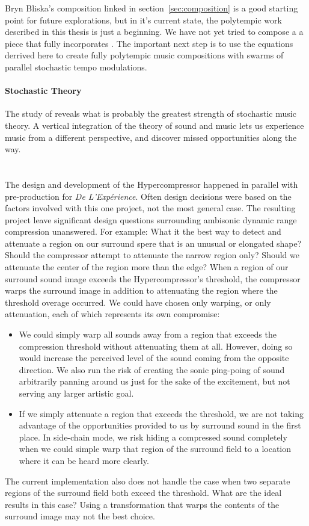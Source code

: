 Bryn Bliska's composition linked in section~\ref{sec:composition} is a
good starting point for future explorations, but in it's current
state, the polytempic work described in this thesis is just a
beginning. We have not yet tried to compose a a piece that fully
incorporates \polytempic. The important next step is to use the
equations derrived here to create fully polytempic music compositions
with swarms of parallel stochastic tempo modulations.

\paragraph{Stochastic Theory} The study of \polytempic reveals what is
probably the greatest strength of stochastic music theory. A vertical
integration of the theory of sound and music lets us experience music
from a different perspective, and discover missed opportunities along the
way. 

\section{\thesis}
The design and development of the Hypercompressor happened in parallel
with pre-production for \textit{De L'Exp\'{e}rience}. Often design
decisions were based on the factors involved with this one project,
not the most general case. The resulting project leave significant
design questions surrounding ambisonic dynamic range compression
unanswered.  For example: What it the best way to detect and attenuate
a region on our surround spere that is an unusual or elongated shape?
Should the compressor attempt to attenuate the narrow region only?
Should we attenuate the center of the region more than the edge? When
a region of our surround sound image exceeds the Hypercompressor's
threshold, the compressor warps the surround image in addition to
attenuating the region where the threshold overage occurred. We could
have chosen only warping, or only attenuation, each of which
represents its own compromise:
\begin{itemize}
\item We could simply warp all sounds away from a region that exceeds
  the compression threshold without attenuating them at all. However,
  doing so would increase the perceived level of the sound coming from
  the opposite direction. We also run the risk of creating the sonic
  ping-poing of sound arbitrarily panning around us just for the sake
  of the excitement, but not serving any larger artistic goal. 
\item If we simply attenuate a region that exceeds the threshold, we
  are not taking advantage of the opportunities provided to us by
  surround sound in the first place. In side-chain mode, we risk
  hiding a compressed sound completely when we could simple warp that
  region of the surround field to a location where it can be heard
  more clearly.
\end{itemize}
The current implementation also does not handle the case when two
separate regions of the surround field both exceed the threshold. What
are the ideal results in this case? Using a transformation that warps
the contents of the surround image may not the best choice.

